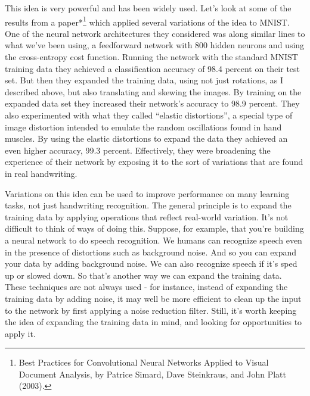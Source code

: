 This idea is very powerful and has been widely used. Let's look at some of the results from a paper*\footnote{Best Practices for Convolutional Neural Networks Applied to Visual Document Analysis, by Patrice Simard, Dave Steinkraus, and John Platt (2003).} which applied several variations of the idea to MNIST. One of the neural network architectures they considered was along similar lines to what we've been using, a feedforward network with 800 hidden neurons and using the cross-entropy cost function. Running the network with the standard MNIST training data they achieved a classification accuracy of 98.4 percent on their test set. But then they expanded the training data, using not just rotations, as I described above, but also translating and skewing the images. By training on the expanded data set they increased their network's accuracy to 98.9 percent. They also experimented with what they called ``elastic distortions'', a special type of image distortion intended to emulate the random oscillations found in hand muscles. By using the elastic distortions to expand the data they achieved an even higher accuracy, 99.3 percent. Effectively, they were broadening the experience of their network by exposing it to the sort of variations that are found in real handwriting.


Variations on this idea can be used to improve performance on many learning tasks, not just handwriting recognition. The general principle is to expand the training data by applying operations that reflect real-world variation. It's not difficult to think of ways of doing this. Suppose, for example, that you're building a neural network to do speech recognition. We humans can recognize speech even in the presence of distortions such as background noise. And so you can expand your data by adding background noise. We can also recognize speech if it's sped up or slowed down. So that's another way we can expand the training data. These techniques are not always used - for instance, instead of expanding the training data by adding noise, it may well be more efficient to clean up the input to the network by first applying a noise reduction filter. Still, it's worth keeping the idea of expanding the training data in mind, and looking for opportunities to apply it.



